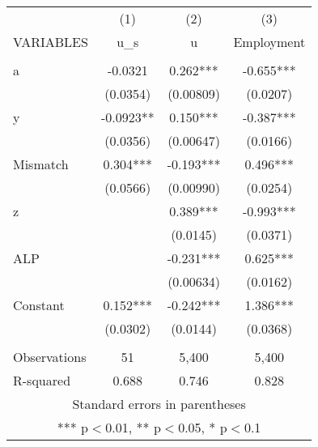 \documentclass[]{article}
\begin{document}
\begin{tabular}{lccc} \hline
 & (1) & (2) & (3) \\
VARIABLES & u\_s & u & Employment \\ \hline
 &  &  &  \\
a & -0.0321 & 0.262*** & -0.655*** \\
 & (0.0354) & (0.00809) & (0.0207) \\
y & -0.0923** & 0.150*** & -0.387*** \\
 & (0.0356) & (0.00647) & (0.0166) \\
Mismatch & 0.304*** & -0.193*** & 0.496*** \\
 & (0.0566) & (0.00990) & (0.0254) \\
z &  & 0.389*** & -0.993*** \\
 &  & (0.0145) & (0.0371) \\
ALP &  & -0.231*** & 0.625*** \\
 &  & (0.00634) & (0.0162) \\
Constant & 0.152*** & -0.242*** & 1.386*** \\
 & (0.0302) & (0.0144) & (0.0368) \\
 &  &  &  \\
Observations & 51 & 5,400 & 5,400 \\
 R-squared & 0.688 & 0.746 & 0.828 \\ \hline
\multicolumn{4}{c}{ Standard errors in parentheses} \\
\multicolumn{4}{c}{ *** p$<$0.01, ** p$<$0.05, * p$<$0.1} \\
\end{tabular}
\end{document}
